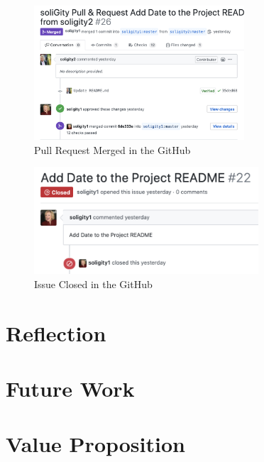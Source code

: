 \documentclass[12pt]{article}
\renewcommand{\_}{\kern-1.5pt\textunderscore\kern-1.5pt}
\begin{document}


\begin{figure}[H]
	\centering
	\includegraphics[height=5cm]{graphs/44. pull_request_closed}
	\caption{Pull Request Merged in the GitHub}
\end{figure}

\begin{figure}[H]
	\centering
	\includegraphics[height=4cm]{graphs/45. issue_closed}
	\caption{Issue Closed in the GitHub}
\end{figure}



\section{Reflection}


\section{Future Work}


\section{Value Proposition}
\end{document}
